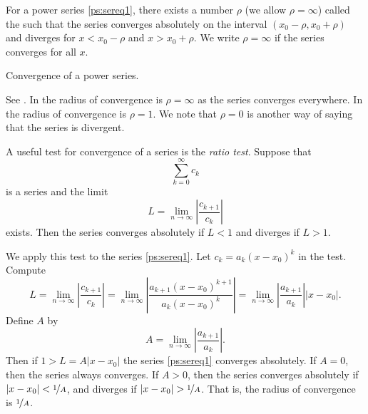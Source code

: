 \documentclass{ximera}
\begin{document}
\begin{theorem}{}
    For a power series \eqref{ps:sereq1}, there exists a number $\rho$ (we allow $\rho=\infty$) called the \emph{} such that the series converges absolutely on the interval $(x_0-\rho,x_0+\rho)$ and diverges for $x < x_0-\rho$ and $x > x_0+\rho$. We write $\rho=\infty$ if the series converges for all $x$.
\end{theorem}

\begin{myfig}
    \capstart
    
    \caption{Convergence of a power series.\label{ps:convfig}}
\end{myfig}

See . In  the radius of convergence is $\rho = \infty$ as the series converges everywhere.  In  the radius of convergence is $\rho=1$. We note that $\rho = 0$ is another way of saying that the series is divergent.

A useful test for convergence of a series is the \emph{ratio test}.  Suppose that
\begin{equation*}
    \sum_{k=0}^\infty c_k
\end{equation*}
is a series and the limit
\begin{equation*}
    L = \lim_{n\to\infty} \left \lvert \frac{c_{k+1}}{c_k} \right \rvert
\end{equation*}
exists.  Then the series converges absolutely if $L < 1$ and diverges if $L > 1$.

We apply this test to the series \eqref{ps:sereq1}. Let $c_k = a_k {(x - x_0)}^k$ in the test.  Compute
\begin{equation*}
    L = \lim_{n\to\infty} \left \lvert \frac{c_{k+1}}{c_k} \right \rvert
    = \lim_{n\to\infty} \left \lvert \frac{a_{k+1} {(x - x_0)}^{k+1}}{a_k {(x - x_0)}^k} \right \rvert 
    = \lim_{n\to\infty} \left \lvert \frac{a_{k+1}}{a_k} \right \rvert \lvert  x - x_0 \rvert .
\end{equation*}
Define $A$ by
\begin{equation*}
    A = \lim_{n\to\infty} \left \lvert \frac{a_{k+1}}{a_k} \right \rvert .
\end{equation*}
Then if $1 > L = A \lvert x - x_0 \rvert$ the series \eqref{ps:sereq1} converges absolutely. If $A = 0$, then the series always converges.  If $A > 0$, then the series converges absolutely if $\lvert x - x_0 \rvert < \nicefrac{1}{A}$, and diverges if $\lvert x - x_0 \rvert > \nicefrac{1}{A}$.  That is, the radius of convergence is $\nicefrac{1}{A}$.
\end{document}
